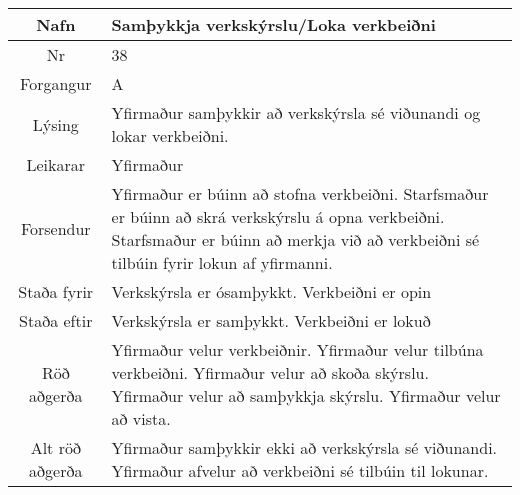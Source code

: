 \documentclass[a4paper]{article}
\begin{document}
\begin{tabular}{|c|p{10cm}|}
\hline
Nafn&Samþykkja verkskýrslu/Loka verkbeiðni\\
\hline
Nr&38\\
\hline
Forgangur&A\\
\hline
Lýsing&Yfirmaður samþykkir að verkskýrsla sé viðunandi og lokar verkbeiðni.\\
\hline
Leikarar&Yfirmaður\\
\hline
Forsendur&Yfirmaður er búinn að stofna verkbeiðni. Starfsmaður er búinn að skrá verkskýrslu á opna verkbeiðni. Starfsmaður er búinn að merkja við að verkbeiðni sé tilbúin fyrir lokun af yfirmanni.\\
\hline
Staða fyrir&Verkskýrsla er ósamþykkt. Verkbeiðni er opin\\
\hline
Staða eftir&Verkskýrsla er samþykkt. Verkbeiðni er lokuð\\
\hline
Röð aðgerða&Yfirmaður velur verkbeiðnir. Yfirmaður velur tilbúna verkbeiðni. Yfirmaður velur að skoða skýrslu. Yfirmaður velur að samþykkja skýrslu. Yfirmaður velur að vista.\\
\hline
Alt röð aðgerða&Yfirmaður samþykkir ekki að verkskýrsla sé viðunandi. Yfirmaður afvelur að verkbeiðni sé tilbúin til lokunar.\\
\hline
\end{tabular}
\end{document}
